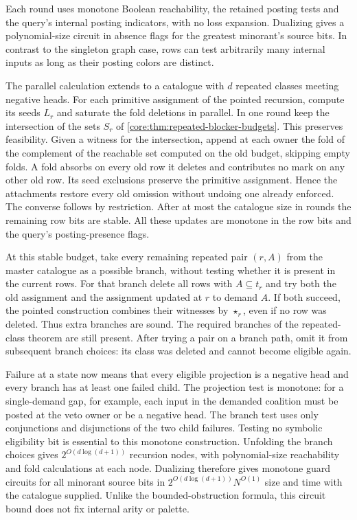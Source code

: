 Each round uses monotone Boolean
reachability, the retained posting
tests and the query's internal posting
indicators, with no loss expansion.
Dualizing gives a polynomial-size
circuit in absence flags for the
greatest minorant's source bits.
In contrast to the singleton graph
case, rows can test arbitrarily many
internal inputs as long as their
posting colors are distinct.

The parallel calculation extends to a
catalogue with $d$ repeated classes meeting
negative heads. For each primitive assignment
of the pointed recursion, compute its seeds
$L_r$ and saturate the fold deletions in
parallel. In one round keep the intersection
of the sets $S_r$ of
\cref{core:thm:repeated-blocker-budgets}.
This preserves feasibility. Given a witness
for the intersection, append at each owner
the fold of the complement of the reachable
set computed on the old budget, skipping
empty folds. A fold absorbs on every old
row it deletes and contributes no mark on
any other old row. Its seed exclusions
preserve the primitive assignment. Hence
the attachments restore every old omission
without undoing one already enforced.
The converse follows by restriction.
After at most the catalogue size in rounds
the remaining row bits are stable. All
these updates are monotone in the row bits
and the query's posting-presence flags.

At this stable budget, take every remaining
repeated pair $(r,A)$ from the master
catalogue as a possible branch, without
testing whether it is present in the
current rows. For that branch delete all
rows with $A\subseteq t_r$ and try both
the old assignment and the assignment
updated at $r$ to demand $A$. If both
succeed, the pointed construction combines
their witnesses by $\star_r$, even if no
row was deleted. Thus extra branches
are sound. The required branches of the
repeated-class theorem are still present.
After trying a pair on a branch path,
omit it from subsequent branch choices:
its class was deleted and cannot become
eligible again.

Failure at a state now means that every
eligible projection is a negative head
and every branch has at least one failed
child. The projection test is monotone:
for a single-demand gap, for example,
each input in the demanded coalition
must be posted at the veto owner or
be a negative head. The branch test
uses only conjunctions and disjunctions
of the two child failures. Testing no
symbolic eligibility bit is essential
to this monotone construction. Unfolding
the branch choices gives
$2^{O(d\log(d+1))}$ recursion nodes,
with polynomial-size reachability and
fold calculations at each node. Dualizing
therefore gives monotone guard circuits
for all minorant source bits in
$2^{O(d\log(d+1))}N^{O(1)}$ size and time
with the catalogue supplied. Unlike
the bounded-obstruction formula, this
circuit bound does not fix internal
arity or palette.

